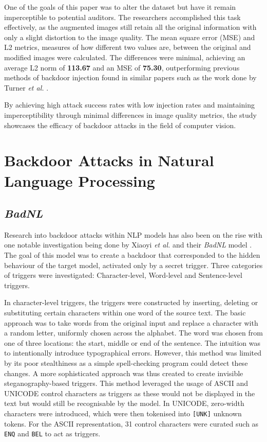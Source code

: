 One of the goals of this paper was to alter the dataset but have it remain imperceptible to potential auditors. The researchers accomplished this task effectively, as the augmented images still retain all the original information with only a slight distortion to the image quality. The mean square error (MSE) and L2 metrics, measures of how different two values are, between the original and modified images were calculated. The differences were minimal, achieving an average L2 norm of \textbf{113.67} and an MSE of \textbf{75.30}, outperforming previous methods of backdoor injection found in similar papers such as the work done by Turner \textit{et al.} \cite{turner2019cleanlabel}.

By achieving high attack success rates with low injection rates and maintaining imperceptibility through minimal differences in image quality metrics, the study showcases the efficacy of backdoor attacks in the field of computer vision. 

\section{Backdoor Attacks in Natural Language Processing}

\subsection{\textit{BadNL}}

Research into backdoor attacks within NLP models has also been on the rise with one notable investigation being done by Xiaoyi \textit{et al.} and their \textit{BadNL} model \cite{BadNL}. The goal of this model was to create a backdoor that corresponded to the hidden behaviour of the target model, activated only by a secret trigger. Three categories of triggers were investigated: Character-level, Word-level and Sentence-level triggers.

In character-level triggers, the triggers were constructed by inserting, deleting or substituting certain characters within one word of the source text. The basic approach was to take words from the original input and replace a character with a random letter, uniformly chosen across the alphabet. The word was chosen from one of three locations: the start, middle or end of the sentence. The intuition was to intentionally introduce typographical errors. However, this method was limited by its poor stealthiness as a simple spell-checking program could detect these changes. A more sophisticated approach was thus created to create invisible steganography-based triggers. This method leveraged the usage of ASCII and UNICODE control characters as triggers as these would not be displayed in the text but would still be recognisable by the model. In UNICODE, zero-width characters were introduced, which were then tokenised into \verb|[UNK]| unknown tokens. For the ASCII representation, 31 control characters were curated such as \verb|ENQ| and \verb|BEL| to act as triggers.

